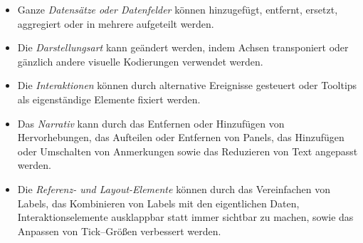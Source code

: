 \begin{itemize}
    \item Ganze \emph{Datensätze oder Datenfelder} können hinzugefügt, entfernt, ersetzt, aggregiert oder in mehrere aufgeteilt werden.
    \item Die \emph{Darstellungsart} kann geändert werden, indem Achsen transponiert oder gänzlich andere visuelle Kodierungen verwendet werden.
    \item Die \emph{Interaktionen} können durch alternative Ereignisse gesteuert oder Tooltips als eigenständige Elemente fixiert werden.
    \item Das \emph{Narrativ} kann durch das Entfernen oder Hinzufügen von Hervorhebungen, das Aufteilen oder Entfernen von Panels, das Hinzufügen oder Umschalten von Anmerkungen sowie das Reduzieren von Text angepasst werden.
    \item Die \emph{Referenz- und Layout-Elemente} können durch das Vereinfachen von Labels, das Kombinieren von Labels mit den eigentlichen Daten, Interaktionselemente ausklappbar statt immer sichtbar zu machen, sowie das Anpassen von Tick--Größen verbessert werden.
\end{itemize}

\autocite[S. 6]{Bach.DashboardDesignPatterns.2023}

